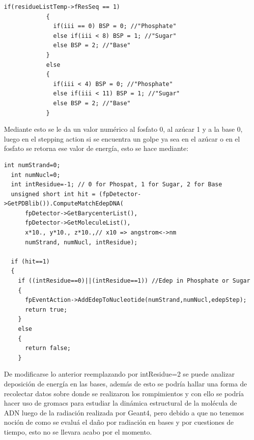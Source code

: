 \lstset {language=C++}
\begin{lstlisting}
if(residueListTemp->fResSeq == 1)
            {
              if(iii == 0) BSP = 0; //"Phosphate"
              else if(iii < 8) BSP = 1; //"Sugar"
              else BSP = 2; //"Base"
            }
            else
            {
              if(iii < 4) BSP = 0; //"Phosphate"
              else if(iii < 11) BSP = 1; //"Sugar"
              else BSP = 2; //"Base"
            }
\end{lstlisting}
Mediante esto se le da un valor numérico al fosfato 0, al azúcar 1 y a la base 0, luego en el stepping action si se encuentra un golpe ya sea en el azúcar o en el fosfato se retorna ese valor de energía, esto se hace mediante:
\lstset {language=C++}
\begin{lstlisting}
int numStrand=0;
  int numNucl=0;
  int intResidue=-1; // 0 for Phospat, 1 for Sugar, 2 for Base
  unsigned short int hit = (fpDetector->GetPDBlib()).ComputeMatchEdepDNA(
      fpDetector->GetBarycenterList(),
      fpDetector->GetMoleculeList(),
      x*10., y*10., z*10.,// x10 => angstrom<->nm
      numStrand, numNucl, intResidue);

  if (hit==1)
  {
    if ((intResidue==0)||(intResidue==1)) //Edep in Phosphate or Sugar
    {
      fpEventAction->AddEdepToNucleotide(numStrand,numNucl,edepStep);
      return true;
    }
    else
    {
      return false;
    }
    \end{lstlisting}

    De modificarse lo anterior reemplazando por intResidue=2 se puede analizar deposición de energía en las bases, además de esto se podría hallar una forma de recolectar datos sobre donde se realizaron los rompimientos y con ello se podría hacer uso de gromacs para estudiar la dinámica estructural de la molécula de ADN luego de la radiación realizada por Geant4, pero debido a que no tenemos noción de como se evaluá el daño por radiación en bases y por cuestiones de tiempo, esto no se llevara acabo por el momento.



